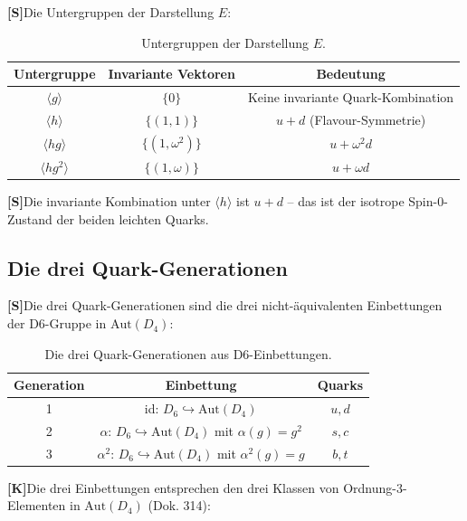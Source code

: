 \documentclass[11pt,a4paper]{article}
\newcommand{\Kstatus}{\textbf{[K]}}
\newcommand{\Sstatus}{\textbf{[S]}}
\begin{document}
	\Sstatus Die Untergruppen der Darstellung $E$:
	
	\begin{table}[h!]
		\centering
		\caption{Untergruppen der Darstellung $E$.}
		\label{tab:e_subgroups}
		\begin{tabular}{c c c}
			\toprule
			\textbf{Untergruppe} & \textbf{Invariante Vektoren} & \textbf{Bedeutung} \\
			\midrule
			$\langle g \rangle$ & $\{0\}$ & Keine invariante Quark-Kombination \\
			$\langle h \rangle$ & $\{(1,1)\}$ & $u+d$ (Flavour-Symmetrie) \\
			$\langle hg \rangle$ & $\{(1,\omega^2)\}$ & $u+\omega^2 d$ \\
			$\langle hg^2 \rangle$ & $\{(1,\omega)\}$ & $u+\omega d$ \\
			\bottomrule
		\end{tabular}
	\end{table}
	
	\Sstatus Die invariante Kombination unter $\langle h \rangle$ ist $u+d$ -- das ist der isotrope Spin-0-Zustand der beiden leichten Quarks.
	
	\subsection{Die drei Quark-Generationen}
	
	\Sstatus Die drei Quark-Generationen sind die drei nicht-äquivalenten Einbettungen der D6-Gruppe in $\text{Aut}(D_4)$:
	
	\begin{table}[h!]
		\centering
		\caption{Die drei Quark-Generationen aus D6-Einbettungen.}
		\label{tab:quark_generations}
		\begin{tabular}{c c c}
			\toprule
			\textbf{Generation} & \textbf{Einbettung} & \textbf{Quarks} \\
			\midrule
			1 & id: $D_6 \hookrightarrow \text{Aut}(D_4)$ & $u, d$ \\
			2 & $\alpha$: $D_6 \hookrightarrow \text{Aut}(D_4)$ mit $\alpha(g) = g^2$ & $s, c$ \\
			3 & $\alpha^2$: $D_6 \hookrightarrow \text{Aut}(D_4)$ mit $\alpha^2(g) = g$ & $b, t$ \\
			\bottomrule
		\end{tabular}
	\end{table}
	
	\Kstatus Die drei Einbettungen entsprechen den drei Klassen von Ordnung-3-Elementen in $\text{Aut}(D_4)$ (Dok. 314):
	
\end{document}
